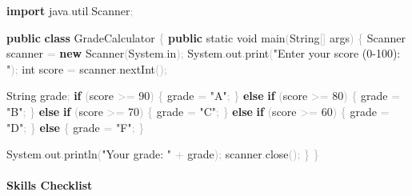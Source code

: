 \documentclass[
  justified,
  openright,
]{tufte-book}
\let\subsection\paragraph
\let\paragraph\paragraph
\newcommand{\KeywordTok}[1]{\textcolor{CodeKeyword}{\textbf{#1}}}  %
\newcommand{\StringTok}[1]{\textcolor{CodeString}{#1}}              %
\newcommand{\CodeNumTok}[1]{\textcolor{CodeNumber}{#1}}             %
\newcommand{\CodeFuncTok}[1]{\textcolor{CodeKeyword}{#1}}           %
\newcommand{\CodeTypeTok}[1]{\textcolor{CodeType}{#1}}              %
\newcommand{\CodeAccentTok}[1]{\textcolor{CodeAccent}{#1}}          %
\newcommand{\OperatorTok}[1]{\textcolor{DarkGray}{#1}}              %
\newenvironment{Shaded}{%
  \begin{mdframed}[style=TufteCode]%
}{%
  \end{mdframed}%
}
\let\subsection\paragraph
\let\paragraph\paragraph
\begin{document}
\begin{Shaded}
\begin{Highlighting}[]
\KeywordTok{import} \CodeAccentTok{java}\OperatorTok{.}\CodeAccentTok{util}\OperatorTok{.}\CodeAccentTok{Scanner}\OperatorTok{;}
 
\KeywordTok{public} \KeywordTok{class} GradeCalculator \OperatorTok{\{}
    \KeywordTok{public} \CodeTypeTok{static} \CodeTypeTok{void} \CodeFuncTok{main}\OperatorTok{(}String\OperatorTok{[]} args\OperatorTok{)} \OperatorTok{\{}
        Scanner scanner \OperatorTok{=} \KeywordTok{new} Scanner\OperatorTok{(}System\OperatorTok{.}\CodeFuncTok{in}\OperatorTok{);}
        System\OperatorTok{.}\CodeFuncTok{out}\OperatorTok{.}\CodeFuncTok{print}\OperatorTok{(}\StringTok{"Enter your score (0{-}100): "}\OperatorTok{);}
        \CodeTypeTok{int} score \OperatorTok{=} scanner\OperatorTok{.}\CodeFuncTok{nextInt}\OperatorTok{();}
 
        String grade\OperatorTok{;}
        \KeywordTok{if} \OperatorTok{(}score \OperatorTok{\textgreater{}=} \CodeNumTok{90}\OperatorTok{)} \OperatorTok{\{}
            grade \OperatorTok{=} \StringTok{"A"}\OperatorTok{;}
        \OperatorTok{\}} \KeywordTok{else} \KeywordTok{if} \OperatorTok{(}score \OperatorTok{\textgreater{}=} \CodeNumTok{80}\OperatorTok{)} \OperatorTok{\{}
            grade \OperatorTok{=} \StringTok{"B"}\OperatorTok{;}
        \OperatorTok{\}} \KeywordTok{else} \KeywordTok{if} \OperatorTok{(}score \OperatorTok{\textgreater{}=} \CodeNumTok{70}\OperatorTok{)} \OperatorTok{\{}
            grade \OperatorTok{=} \StringTok{"C"}\OperatorTok{;}
        \OperatorTok{\}} \KeywordTok{else} \KeywordTok{if} \OperatorTok{(}score \OperatorTok{\textgreater{}=} \CodeNumTok{60}\OperatorTok{)} \OperatorTok{\{}
            grade \OperatorTok{=} \StringTok{"D"}\OperatorTok{;}
        \OperatorTok{\}} \KeywordTok{else} \OperatorTok{\{}
            grade \OperatorTok{=} \StringTok{"F"}\OperatorTok{;}
        \OperatorTok{\}}
 
        System\OperatorTok{.}\CodeFuncTok{out}\OperatorTok{.}\CodeFuncTok{println}\OperatorTok{(}\StringTok{"Your grade: "} \OperatorTok{+} grade\OperatorTok{);}
        scanner\OperatorTok{.}\CodeFuncTok{close}\OperatorTok{();}
    \OperatorTok{\}}
\OperatorTok{\}}
\end{Highlighting}
\end{Shaded}

\subsection{Skills Checklist}\label{skills-checklist-74}
\end{document}
